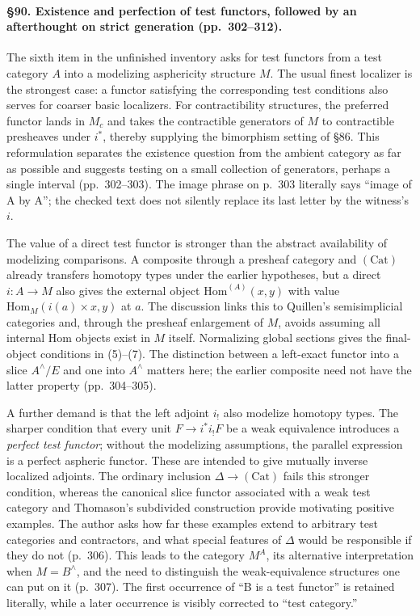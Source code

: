 \paragraph{\S90. Existence and perfection of test functors, followed by an afterthought on strict generation (pp.\ 302--312).}
The sixth item in the unfinished inventory asks for test functors from a test category $A$ into a modelizing asphericity structure $M$. The usual finest localizer is the strongest case: a functor satisfying the corresponding test conditions also serves for coarser basic localizers. For contractibility structures, the preferred functor lands in $M_c$ and takes the contractible generators of $M$ to contractible presheaves under $i^*$, thereby supplying the bimorphism setting of \S86. This reformulation separates the existence question from the ambient category as far as possible and suggests testing on a small collection of generators, perhaps a single interval (pp.\ 302--303). The image phrase on p.\ 303 literally says “image of A by A”; the checked text does not silently replace its last letter by the witness's $i$.

The value of a direct test functor is stronger than the abstract availability of modelizing comparisons. A composite through a presheaf category and $(\mathrm{Cat})$ already transfers homotopy types under the earlier hypotheses, but a direct $i:A\to M$ also gives the external object $\mathrm{Hom}^{(A)}(x,y)$ with value $\mathrm{Hom}_M(i(a)\times x,y)$ at $a$. The discussion links this to Quillen's semisimplicial categories and, through the presheaf enlargement of $M$, avoids assuming all internal Hom objects exist in $M$ itself. Normalizing global sections gives the final-object conditions in (5)--(7). The distinction between a left-exact functor into a slice $A^\wedge/E$ and one into $A^\wedge$ matters here; the earlier composite need not have the latter property (pp.\ 304--305).

A further demand is that the left adjoint $i_!$ also modelize homotopy types. The sharper condition that every unit $F\to i^*i_!F$ be a weak equivalence introduces a \emph{perfect test functor}; without the modelizing assumptions, the parallel expression is a perfect aspheric functor. These are intended to give mutually inverse localized adjoints. The ordinary inclusion $\Delta\to(\mathrm{Cat})$ fails this stronger condition, whereas the canonical slice functor associated with a weak test category and Thomason's subdivided construction provide motivating positive examples. The author asks how far these examples extend to arbitrary test categories and contractors, and what special features of $\Delta$ would be responsible if they do not (p.\ 306). This leads to the category $M^A$, its alternative interpretation when $M=B^\wedge$, and the need to distinguish the weak-equivalence structures one can put on it (p.\ 307). The first occurrence of “B is a test functor” is retained literally, while a later occurrence is visibly corrected to “test category.”

